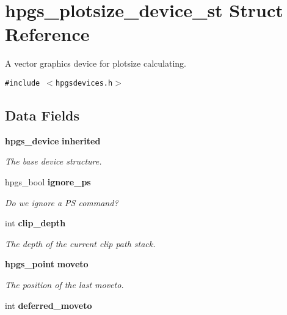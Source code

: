\section{hpgs\_\-plotsize\_\-device\_\-st Struct Reference}
\label{structhpgs__plotsize__device__st}
A vector graphics device for plotsize calculating.  


{\tt \#include $<$hpgsdevices.h$>$}

\subsection*{Data Fields}
\begin{CompactItemize}
\item 
{\bf hpgs\_\-device} {\bf inherited}\label{structhpgs__plotsize__device__st_896e5ef39be8fb94f861db9d51800c3e}

\begin{CompactList}\small\item\em The base device structure. \item\end{CompactList}\item 
hpgs\_\-bool {\bf ignore\_\-ps}\label{structhpgs__plotsize__device__st_b33cc0245c082105f5bb0cb9a1ce47b2}

\begin{CompactList}\small\item\em Do we ignore a PS command? \item\end{CompactList}\item 
int {\bf clip\_\-depth}\label{structhpgs__plotsize__device__st_397e61533c894d3396d6452572cecaf3}

\begin{CompactList}\small\item\em The depth of the current clip path stack. \item\end{CompactList}\item 
{\bf hpgs\_\-point} {\bf moveto}\label{structhpgs__plotsize__device__st_69ad990dc8df48bde3470d1dd562beac}

\begin{CompactList}\small\item\em The position of the last moveto. \item\end{CompactList}\item 
int {\bf deferred\_\-moveto}\label{structhpgs__plotsize__device__st_5322a4a685eb24f0a3ef5bf897a85364}


\end{CompactItemize}
